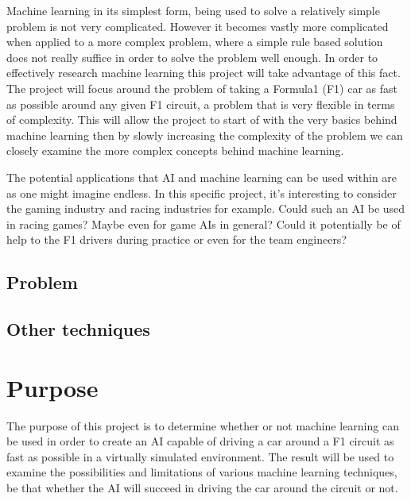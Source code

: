 Machine learning in its simplest form, being used to solve a relatively simple problem is not very complicated. However it becomes vastly more complicated when applied to a more complex problem, where a simple rule based solution does not really suffice in order to solve the problem well enough. In order to effectively research machine learning this project will take advantage of this fact. The project will focus around the problem of taking a Formula1 (F1) car as fast as possible around any given F1 circuit, a problem that is very flexible in terms of complexity. This will allow the project to start of with the very basics behind machine learning then by slowly increasing the complexity of the problem we can closely examine the more complex concepts behind machine learning.

The potential applications that AI and machine learning can be used within are as one might imagine endless. In this specific project, it's interesting to consider the gaming industry and racing industries for example. Could such an AI be used in racing games? Maybe even for game AIs in general? Could it potentially be of help to the F1 drivers during practice or even for the team engineers? 

\subsection{Problem}
\subsection{Other techniques}


\section{Purpose} %
The purpose of this project is to determine whether or not machine learning can be used in order to create an AI capable of driving a car around a F1 circuit as fast as possible in a virtually simulated environment. The result will be used to examine the possibilities and limitations of various machine learning techniques, be that whether the AI will succeed in driving the car around the circuit or not. 



